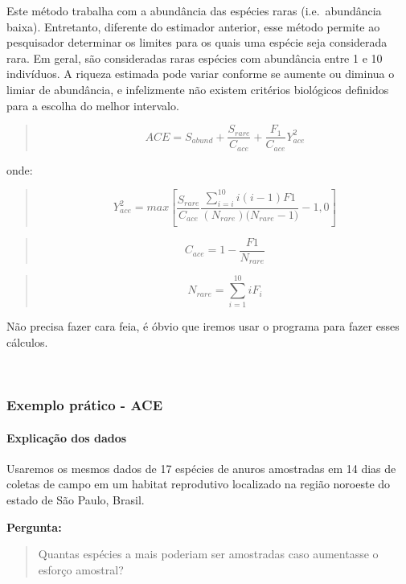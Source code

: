 \documentclass[
]{book}
\begin{document}
Este método trabalha com a abundância das espécies raras (i.e.~abundância baixa). Entretanto, diferente do estimador anterior, esse método permite ao pesquisador determinar os limites para os quais uma espécie seja considerada rara. Em geral, são consideradas raras espécies com abundância entre 1 e 10 indivíduos. A riqueza estimada pode variar conforme se aumente ou diminua o limiar de abundância, e infelizmente não existem critérios biológicos definidos para a escolha do melhor intervalo.

\begin{quote}
\[ACE = S_{abund} + \frac{S_{rare}}{C_{ace}} + \frac{F_1}{C_{ace}}Y_{ace}^2\]
\end{quote}

onde:

\begin{quote}
\[Y_{ace}^2 = max \left[\frac{S_{rare}}{C_{ace}}\frac{\sum_{i=i}^{10}i(i-1)F1}{(N_{rare})({N_{rare} - 1)}}-1,0\right]\]
\end{quote}

\begin{quote}
\[C_{ace} = 1 - \frac{F1}{N_{rare}}\]
\end{quote}

\begin{quote}
\[N_{rare} = \sum_{i=1}^{10}iF_i\]
\end{quote}

Não precisa fazer cara feia, é óbvio que iremos usar o programa para fazer esses cálculos.

~

\hypertarget{exemplo-pruxe1tico---ace}{%
\subsubsection{Exemplo prático - ACE}\label{exemplo-pruxe1tico---ace}}

\hypertarget{explicauxe7uxe3o-dos-dados-1}{%
\paragraph{Explicação dos dados}\label{explicauxe7uxe3o-dos-dados-1}}

Usaremos os mesmos dados de 17 espécies de anuros amostradas em 14 dias de coletas de campo em um habitat reprodutivo localizado na região noroeste do estado de São Paulo, Brasil.

\textbf{Pergunta:}

\begin{quote}
Quantas espécies a mais poderiam ser amostradas caso aumentasse o esforço amostral?
\end{quote}
\end{document}
